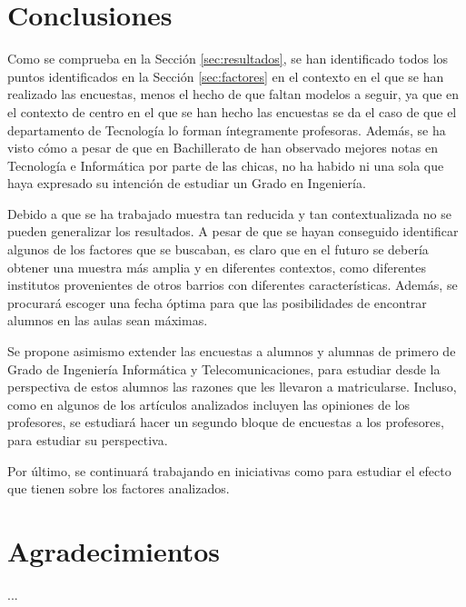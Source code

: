 \documentclass[runningheads,a4paper]{llncs}
\begin{document}
\section{Conclusiones}
\label{sec:conclusiones}

Como se comprueba en la Sección \ref{sec:resultados}, se han identificado todos los puntos identificados en la Sección \ref{sec:factores} en el contexto en el que se han realizado las encuestas, menos el hecho de que faltan modelos a seguir, ya que en el contexto de centro en el que se han hecho las encuestas se da el caso de que el departamento de Tecnología lo forman íntegramente profesoras. Además, se ha visto cómo a pesar de que en Bachillerato de han observado mejores notas en Tecnología e Informática por parte de las chicas, no ha habido ni una sola que haya expresado su intención de estudiar un Grado en Ingeniería.

Debido a que se ha trabajado muestra tan reducida y tan contextualizada no se pueden generalizar los resultados. A pesar de que se hayan conseguido identificar algunos de los factores que se buscaban, es claro que en el futuro se debería obtener una muestra más amplia y en diferentes contextos, como diferentes institutos provenientes de otros barrios con diferentes características. Además, se procurará escoger una fecha óptima para que las posibilidades de encontrar alumnos en las aulas sean máximas.

Se propone asimismo extender las encuestas a alumnos y alumnas de primero de Grado de Ingeniería Informática y Telecomunicaciones, para estudiar desde la perspectiva de estos alumnos las razones que les llevaron a matricularse. Incluso, como en algunos de los artículos analizados incluyen las opiniones de los profesores, se estudiará hacer un segundo bloque de encuestas a los profesores, para estudiar su perspectiva.

Por último, se continuará trabajando en iniciativas como \cite{cchicas:site} para estudiar el efecto que tienen sobre los factores analizados.

\section*{Agradecimientos} 

...


%




\end{document}
